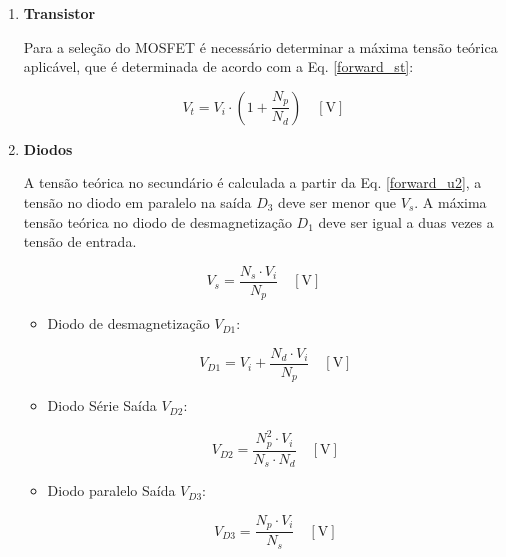 \begin{apendicesenv}
\begin{enumerate}
\item \textbf{Transistor}

Para a seleção do MOSFET é necessário determinar a máxima tensão teórica aplicável, que é determinada de acordo com a Eq. \ref{forward_st}: 
    
    \begin{equation}
        V_{t} = V_{i} \cdot \left( 1 + \frac{N_{p}}{N_{d}} \right) \quad [\text{V}]
        \label{forward_st}
    \end{equation}

\item \textbf{Diodos}

A tensão teórica no secundário é calculada a partir da Eq. \ref{forward_u2}, a tensão no diodo em paralelo na saída $D_{3}$ deve ser menor que $V_{s}$. A máxima tensão teórica no diodo de desmagnetização $D_{1}$ deve ser igual a duas vezes a tensão de entrada. 


\begin{equation}
        V_{s} = \frac{N_{s} \cdot V_{i}}{N_{p}} \quad [\text{V}]
        \label{forward_u2}
    \end{equation}


\begin{itemize}

    \item Diodo de desmagnetização $V_{D1}$:
    
    \begin{equation}
        V_{D1} = V_{i} + \frac{N_{d} \cdot V_{i}}{N_{p}} \quad [\text{V}]
    \end{equation}

    \item Diodo Série Saída $V_{D2}$: 
    
    \begin{equation}
        V_{D2} = \frac{N_{p}^{2} \cdot V_{i}}{N_{s} \cdot N_{d}} \quad [\text{V}]
    \end{equation}
    
    \item Diodo paralelo Saída $V_{D3}$:
    
    \begin{equation}
        V_{D3} = \frac{N_{p} \cdot V_{i}}{N_{s}} \quad [\text{V}]
    \end{equation}
    

\end{itemize}
\end{enumerate}
\end{apendicesenv}
